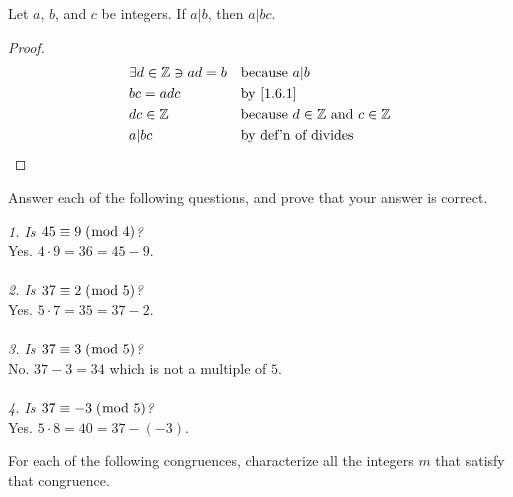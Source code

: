 \documentclass[../main.tex]{subfiles}
\begin{document}
\begin{thm} \label{1.6}
Let $a$, $b$, and $c$ be integers. If $a|b$, then $a|bc$.
\end{thm}

\begin{proof}
\begin{align}
    \label{1.6.1}
    &\exists d \in \mathbb{Z} \ni ad = b && \mbox{because } a|b \\
    &bc = adc && \mbox{by \eqref{1.6.1}} \\
    &dc \in \mathbb{Z} && \mbox{because } d \in \mathbb{Z} \mbox{ and } c \in \mathbb{Z} \\
    &a|bc && \mbox{by def'n of divides} \qedhere
\end{align}
\end{proof}



\begin{ex} \label{1.7}
Answer each of the following questions, and prove that your answer is correct.
\end{ex}

\hspace*{0.1mm} \emph{1. Is $45 \equiv 9 \; (\bmod \; 4)$?} \\
\hspace*{15mm} Yes. $4 \cdot 9 = 36 = 45 - 9$.
\\\\
\hspace*{5mm} \emph{2. Is $37 \equiv 2 \; (\bmod \; 5)$?} \\
\hspace*{15mm} Yes. $5 \cdot 7 = 35 = 37 - 2$.
\\\\
\hspace*{5mm} \emph{3. Is $37 \equiv 3 \; (\bmod \; 5)$?} \\
\hspace*{15mm} No. $37 - 3 = 34$ which is not a multiple of $5$.
\\\\
\hspace*{5mm} \emph{4. Is $37 \equiv -3 \; (\bmod \; 5)$?} \\
\hspace*{15mm} Yes. $5 \cdot 8 = 40 = 37 - (-3)$. \\



\begin{ex} \label{1.8}
For each of the following congruences, characterize all the integers $m$ that satisfy that congruence.
\end{ex}
\end{document}
